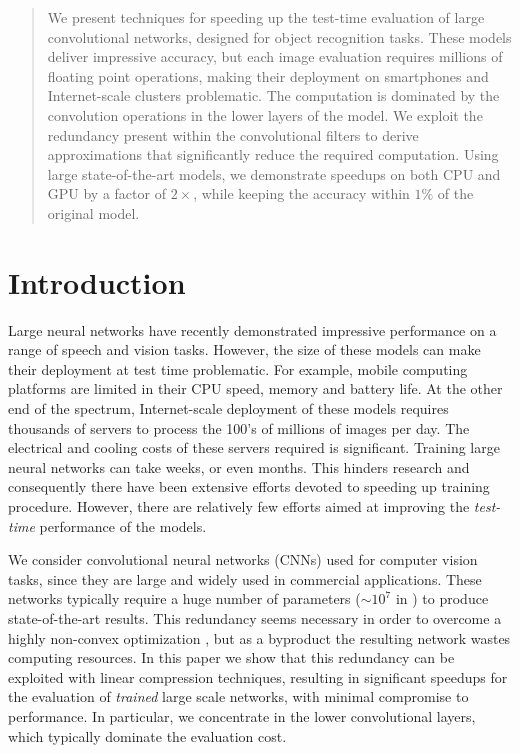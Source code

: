 \begin{abstract}
  We present techniques for speeding up the test-time evaluation of
  large convolutional networks, designed for object recognition
  tasks. These models deliver impressive accuracy, but each image
  evaluation requires millions of floating point operations, making
  their deployment on smartphones and Internet-scale clusters
  problematic. The computation is dominated by the convolution
  operations in the lower layers of the model. We exploit the redundancy
  present within the convolutional filters to derive
  approximations that significantly reduce the required
  computation. Using large state-of-the-art models, we demonstrate
  speedups on both CPU and GPU by a factor of $2\times$, while keeping the accuracy
  within $1\%$ of the original model.
\end{abstract}

\section{Introduction}

Large neural networks have recently demonstrated impressive
performance on a range of speech and vision tasks. However, the size of
these models can make their deployment at test time problematic. For
example, mobile computing platforms are limited in their CPU speed,
memory and battery life. At the other end of the spectrum,
Internet-scale deployment of these models requires thousands of
servers to process the 100's of millions of images per day. The
electrical and cooling costs of these servers required is significant.
Training large neural networks can take weeks, or even
months. This hinders research and consequently there have been
extensive efforts devoted to speeding up training procedure.  However,
there are relatively few efforts aimed at improving the {\em test-time}
performance of the models. 

 We consider convolutional neural networks (CNNs) used for computer vision tasks, since
they are large and widely used in commercial applications. 
These networks typically require a huge number of parameters ($\sim 10^{7}$ in \cite{overfeat})
to produce state-of-the-art results. This redundancy seems necessary in order
to overcome a highly non-convex optimization \cite{denil2013predicting, hintonseparable}, 
but as a byproduct the resulting network wastes computing resources.
In this paper we show that this redundancy can be 
exploited with linear compression techniques,
resulting in significant speedups for the evaluation of {\em trained}
large scale networks, with minimal compromise to performance.
In particular, we concentrate in the lower convolutional layers, which 
typically dominate the evaluation cost. 

